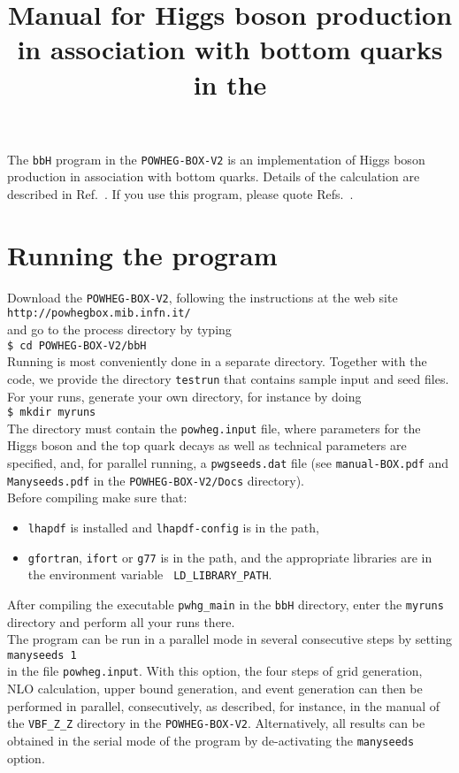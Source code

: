 \documentclass[a4paper,11pt]{article}
\title{Manual for  Higgs boson production in association with bottom quarks in the \POWHEGBOXV{}}
\date{}
\newcommand\POWHEGBOXV{{\tt POWHEG-BOX-V2}}
\begin{document}
\maketitle
%
\noindent
The {\tt bbH} program in the \POWHEGBOXV{} is an implementation of Higgs boson production in association with bottom quarks. Details of the calculation are described in Ref.~\cite{JRW}. If you use this program, please quote Refs.~\cite{JRW,Dawson:2003kb,Dawson:2005vi,Alioli:2010xd}.
%
\section*{Running the program}
%
Download the \POWHEGBOXV{}, following the instructions at the web site 
\\[2ex]
{\tt http://powhegbox.mib.infn.it/}
\\[2ex] 
and go to the process directory by typing 
\\[2ex]
{\tt \$ cd \POWHEGBOXV/bbH}  
\\[2ex]
Running is most conveniently done in a separate directory. Together with the code, we provide the directory {\tt testrun} that contains sample input and seed files. 
\\[2ex]
For your runs, generate your own directory, for instance by doing 
\\[2ex]
{\tt \$ mkdir myruns}
\\[2ex]
The directory must contain the {\tt powheg.input} file, where parameters for the Higgs boson and the top quark decays as well as technical  parameters are specified, and, for
parallel running, a {\tt pwgseeds.dat} file (see {\tt manual-BOX.pdf}
and {\tt Manyseeds.pdf} in the  {\tt POWHEG-BOX-V2/Docs} directory).
\\[2ex]
Before compiling make sure that:
\begin{itemize}
\item 
{\tt lhapdf} is installed and {\tt lhapdf-config} is in the path,
\item
{\tt gfortran}, {\tt ifort} or {\tt g77} is in the path, and the
appropriate libraries are in the environment variable {\tt
  LD\_LIBRARY\_PATH}. 
\end{itemize}
After compiling the executable {\tt pwhg\_main} in the {\tt bbH} directory, enter the {\tt myruns} directory and perform all your runs there. 
\\[2ex]
The program can be run in a parallel mode in several consecutive steps by setting 
\\[2ex]
{\tt manyseeds   1}
\\[2ex]
in the file  {\tt powheg.input}.  With this option, the four steps of grid generation, NLO calculation, upper bound generation, and event generation can then be performed in parallel, consecutively, as described, for instance, in the manual of the {\tt VBF\_Z\_Z} directory in the \POWHEGBOXV{}. Alternatively, all results can be obtained in the serial mode of the program by de-activating the  {\tt manyseeds} option. 
\end{document}
